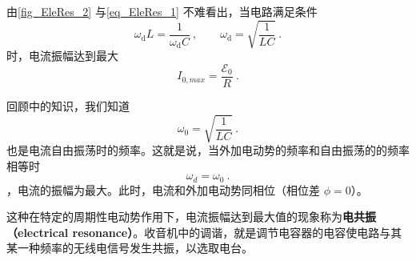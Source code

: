 由\autoref{fig_EleRes_2} 与\autoref{eq_EleRes_1} 不难看出，当电路满足条件
\begin{equation}
\omega_{\mathrm{d}} L=\dfrac{1}{\omega_{\mathrm{d}} C}~,
\qquad 
\omega_{\mathrm{d}}=\sqrt{\frac{1}{L C}}~.
\end{equation}
时，电流振幅达到最大
$$I_{0,max}=\dfrac{\mathscr{E}_{0}}{R}~.$$

回顾中的知识，我们知道$$\omega_0 = \sqrt{\frac{1}{LC}}~.$$也是电流自由振荡时的频率。这就是说，当外加电动势的频率和自由振荡的的频率相等时$$\omega_d=\omega_0~.$$，电流的振幅为最大。此时，电流和外加电动势同相位（相位差 $\phi=0$）。

这种在特定的周期性电动势作用下，电流振幅达到最大值的现象称为\textbf{电共振（electrical resonance）}。收音机中的调谐，就是调节电容器的电容使电路与其某一种频率的无线电信号发生共振，以选取电台。
